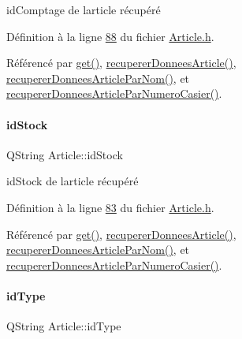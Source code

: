id\+Comptage de l\textquotesingle{}article récupéré 



Définition à la ligne \hyperlink{_article_8h_source_l00088}{88} du fichier \hyperlink{_article_8h_source}{Article.\+h}.



Référencé par \hyperlink{_article_8cpp_source_l00266}{get()}, \hyperlink{_article_8cpp_source_l00050}{recuperer\+Donnees\+Article()}, \hyperlink{_article_8cpp_source_l00103}{recuperer\+Donnees\+Article\+Par\+Nom()}, et \hyperlink{_article_8cpp_source_l00156}{recuperer\+Donnees\+Article\+Par\+Numero\+Casier()}.

\mbox{\label{class_article_afb7785930598d5fbdafb707acdd3eec1}} 
\paragraph{\texorpdfstring{id\+Stock}{idStock}}
{\footnotesize\ttfamily Q\+String Article\+::id\+Stock\hspace{0.3cm}{\ttfamily [private]}}



id\+Stock de l\textquotesingle{}article récupéré 



Définition à la ligne \hyperlink{_article_8h_source_l00083}{83} du fichier \hyperlink{_article_8h_source}{Article.\+h}.



Référencé par \hyperlink{_article_8cpp_source_l00266}{get()}, \hyperlink{_article_8cpp_source_l00050}{recuperer\+Donnees\+Article()}, \hyperlink{_article_8cpp_source_l00103}{recuperer\+Donnees\+Article\+Par\+Nom()}, et \hyperlink{_article_8cpp_source_l00156}{recuperer\+Donnees\+Article\+Par\+Numero\+Casier()}.

\mbox{\label{class_article_a1586203d0eb334a3298ca719f924083d}} 
\paragraph{\texorpdfstring{id\+Type}{idType}}
{\footnotesize\ttfamily Q\+String Article\+::id\+Type\hspace{0.3cm}{\ttfamily [private]}}



